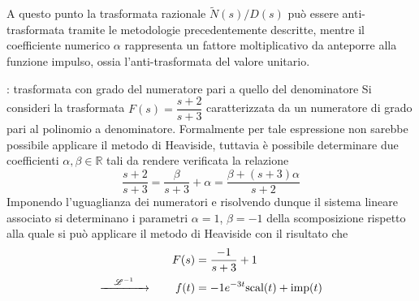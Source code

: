 			A questo punto la trasformata razionale $\tilde N(s)/D(s)$ può essere anti-trasformata tramite le metodologie precedentemente descritte, mentre il coefficiente numerico $\alpha$ rappresenta un fattore moltiplicativo da anteporre alla funzione impulso, ossia l'anti-trasformata del valore unitario.
			
			\begin{esempio}{: trasformata con grado del numeratore pari a quello del denominatore}
				Si consideri la trasformata $F(s)=\dfrac{s+2}{s+3}$ caratterizzata da un numeratore di grado pari al polinomio a denominatore. Formalmente per tale espressione non sarebbe possibile applicare il metodo di Heaviside, tuttavia è possibile determinare due coefficienti $\alpha,\beta \in \mathds R$ tali da rendere verificata la relazione
				\[\frac{s+2}{s+3} = \frac{\beta}{s+3} + \alpha = \frac{\beta + (s+3)\alpha}{s+2}\]
				Imponendo l'uguaglianza dei numeratori e risolvendo dunque il sistema lineare associato si determinano i parametri $\alpha = 1$, $\beta = -1$ della scomposizione rispetto alla quale si può applicare il metodo di Heaviside con il risultato che
				\begin{align*}
					F(s) & = \frac{-1}{s+3} + 1 \\
					\xrightarrow{ \quad \mathscr {L}^{-1} \quad } \qquad f(t) & = - 1 e^{-3t} \textrm{scal}(t) + \textrm{imp}(t)
				\end{align*}
				
			\end{esempio}
			
			
			
			
			
			
			
			
			
			
			
			
			
			